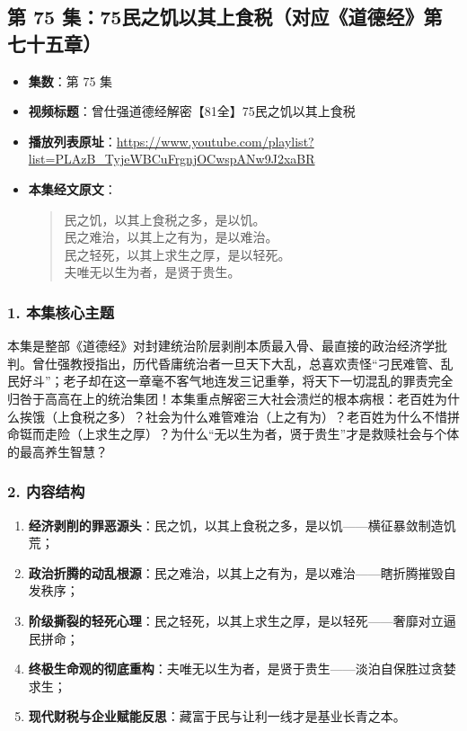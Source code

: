\clearpage

\subsection{第 75 集：75民之饥以其上食税（对应《道德经》第七十五章）}
\label{sec:ep75}

\begin{itemize}
    \item \textbf{集数}：第 75 集
    \item \textbf{视频标题}：曾仕强道德经解密【81全】75民之饥以其上食税
    \item \textbf{播放列表原址}：\url{https://www.youtube.com/playlist?list=PLAzB_TyjeWBCuFrgnjOCwspANw9J2xaBR}
    \item \textbf{本集经文原文}：
    \begin{quote}\kaishu
    民之饥，以其上食税之多，是以饥。\\
    民之难治，以其上之有为，是以难治。\\
    民之轻死，以其上求生之厚，是以轻死。\\
    夫唯无以生为者，是贤于贵生。
    \end{quote}
\end{itemize}

\subsubsection{1. 本集核心主题}
本集是整部《道德经》对封建统治阶层剥削本质最入骨、最直接的政治经济学批判。曾仕强教授指出，历代昏庸统治者一旦天下大乱，总喜欢责怪“刁民难管、乱民好斗”；老子却在这一章毫不客气地连发三记重拳，将天下一切混乱的罪责完全归咎于高高在上的统治集团！本集重点解密三大社会溃烂的根本病根：老百姓为什么挨饿（上食税之多）？社会为什么难管难治（上之有为）？老百姓为什么不惜拼命铤而走险（上求生之厚）？为什么“无以生为者，贤于贵生”才是救赎社会与个体的最高养生智慧？

\subsubsection{2. 内容结构}
\begin{enumerate}
    \item \textbf{经济剥削的罪恶源头}：民之饥，以其上食税之多，是以饥——横征暴敛制造饥荒；
    \item \textbf{政治折腾的动乱根源}：民之难治，以其上之有为，是以难治——瞎折腾摧毁自发秩序；
    \item \textbf{阶级撕裂的轻死心理}：民之轻死，以其上求生之厚，是以轻死——奢靡对立逼民拼命；
    \item \textbf{终极生命观的彻底重构}：夫唯无以生为者，是贤于贵生——淡泊自保胜过贪婪求生；
    \item \textbf{现代财税与企业赋能反思}：藏富于民与让利一线才是基业长青之本。
\end{enumerate}

